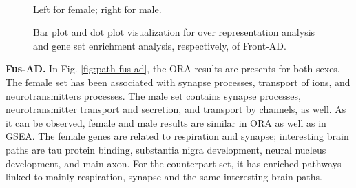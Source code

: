 \begin{figure}[!ht]%
    \centering
    \qquad
    \\
    \qquad
\caption{Bar plot and dot plot visualization for over representation analysis and gene set enrichment analysis, respectively, of Front-AD.}
\footnotesize Left for female; right for male.
\label{fig:path-front-ad}%
\end{figure}

\textbf{Fus-AD.} In Fig. \ref{fig:path-fus-ad}, the ORA results are presents for both sexes. The female set has been associated with synapse processes, transport of ions, and neurotransmitters processes. The male set contains synapse processes, neurotransmitter transport and secretion, and transport by channels, as well. As it can be observed, female and male results are similar in ORA as well as in GSEA. The female genes are related to respiration and synapse; interesting brain paths are tau protein binding, substantia nigra development, neural nucleus development, and main axon. For the counterpart set, it has enriched pathways linked to mainly respiration, synapse and the same interesting brain paths.

